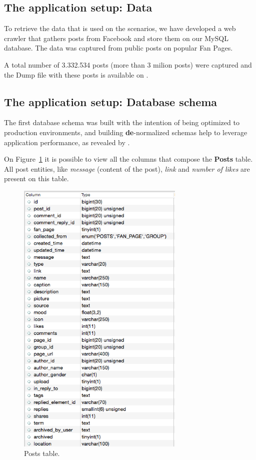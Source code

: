 \subsection{The application setup: Data}
To retrieve the data that is used on the scenarios, we have developed a web crawler that gathers posts from Facebook and store them on our MySQL database. The data was captured from public posts on popular Fan Pages.

A total number of 3.332.534 posts (more than 3 milion posts) were captured and the Dump file with these posts is available on \cite{dump}. 

\subsection{The application setup: Database schema}
\label{database_schema_section}
The first database schema was built with the intention of being optimized to production environments, and building \textbf{de}-normalized schemas help to leverage application performance, as revealed by \cite{926306}. 

On Figure~\ref{fig:postsTable} it is possible to view all the columns that compose the \textbf{Posts} table. All post entities, like \textit{message} (content of the post), \textit{link} and \textit{number of likes} are present on this table. 

\begin{figure}[ht!]
\centering
\includegraphics[width=80mm]{postTable.png}
\caption{Posts table.\label{fig:postsTable}}
\end{figure}

